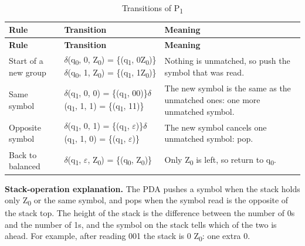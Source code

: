 \documentclass[12pt,a4paper]{article}
\begin{document}
{\footnotesize
\begin{longtable}{|>{\raggedright\arraybackslash}p{}|>{\raggedright\arraybackslash}p{}|>{\raggedright\arraybackslash}p{}|}
\caption[Transitions of P1]{Transitions of P\textsubscript{1}}\label{tab:eq_delta}\\
\hline
\rowcolor{hdr}\textbf{Rule} & \textbf{Transition} & \textbf{Meaning}\\ \hline
\endfirsthead
\hline
\rowcolor{hdr}\textbf{Rule} & \textbf{Transition} & \textbf{Meaning}\\ \hline
\endhead
Start of a new group & \ensuremath{\delta}(q\textsubscript{0}, 0, Z\textsubscript{0}) = \{(q\textsubscript{1}, 0Z\textsubscript{0})\}\newline \ensuremath{\delta}(q\textsubscript{0}, 1, Z\textsubscript{0}) = \{(q\textsubscript{1}, 1Z\textsubscript{0})\} & Nothing is unmatched, so push the symbol that was read.\\ \hline
Same symbol & \ensuremath{\delta}(q\textsubscript{1}, 0, 0) = \{(q\textsubscript{1}, 00)\}\newline \ensuremath{\delta}(q\textsubscript{1}, 1, 1) = \{(q\textsubscript{1}, 11)\} & The new symbol is the same as the unmatched ones: one more unmatched symbol.\\ \hline
Opposite symbol & \ensuremath{\delta}(q\textsubscript{1}, 0, 1) = \{(q\textsubscript{1}, \ensuremath{\varepsilon})\}\newline \ensuremath{\delta}(q\textsubscript{1}, 1, 0) = \{(q\textsubscript{1}, \ensuremath{\varepsilon})\} & The new symbol cancels one unmatched symbol: pop.\\ \hline
Back to balanced & \ensuremath{\delta}(q\textsubscript{1}, \ensuremath{\varepsilon}, Z\textsubscript{0}) = \{(q\textsubscript{0}, Z\textsubscript{0})\} & Only Z\textsubscript{0} is left, so return to q\textsubscript{0}.\\ \hline
\end{longtable}}

\textbf{Stack-operation explanation.} The PDA pushes a symbol when the stack holds only Z\textsubscript{0} or the same symbol, and pops when the symbol read is the opposite of the stack top. The height of the stack is the difference between the number of 0s and the number of 1s, and the symbol on the stack tells which of the two is ahead. For example, after reading 001 the stack is 0 Z\textsubscript{0}: one extra 0.
\end{document}
